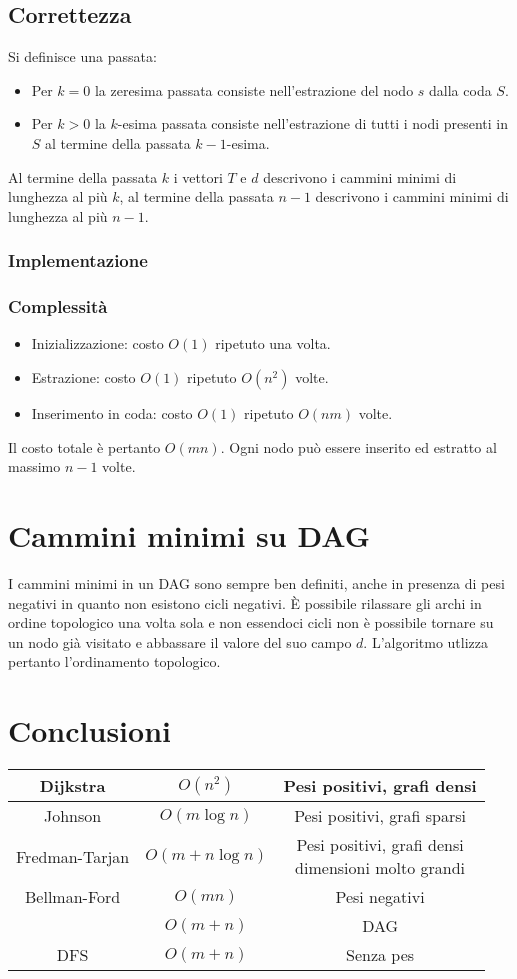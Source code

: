 \subsection{Correttezza}
Si definisce una passata:
\begin{itemize}
	\item Per $k=0$ la zeresima passata consiste nell'estrazione del nodo $s$ dalla coda $S$.
	\item Per $k>0$ la $k$-esima passata consiste nell'estrazione di tutti i nodi presenti in $S$ al termine della passata $k-1$-esima.
\end{itemize}
Al termine della passata $k$ i vettori $T$ e $d$ descrivono i cammini minimi di lunghezza al pi\`u $k$, al termine della passata $n-1$ descrivono i cammini minimi di lunghezza al pi\`u
$n-1$. 
\subsubsection{Implementazione}

\subsubsection{Complessit\`a}
\begin{itemize}
	\item Inizializzazione: costo $O(1)$ ripetuto una volta.
	\item Estrazione: costo $O(1)$ ripetuto $O(n^2)$ volte.
	\item Inserimento in coda: costo $O(1)$ ripetuto $O(nm)$ volte.
\end{itemize}
Il costo totale \`e pertanto $O(mn)$. Ogni nodo pu\`o essere inserito ed estratto al massimo $n-1$ volte.
\section{Cammini minimi su DAG}
I cammini minimi in un DAG sono sempre ben definiti, anche in presenza di pesi negativi in quanto non esistono cicli negativi. \`E possibile rilassare gli archi in ordine topologico una
volta sola e non essendoci cicli non \`e possibile tornare su un nodo gi\`a visitato e abbassare il valore del suo campo $d$. L'algoritmo utlizza pertanto l'ordinamento topologico.\\

\section{Conclusioni}
\begin{tabular}{|c|c|c|}
	\hline
	Dijkstra & $O(n^2)$ & Pesi positivi, grafi densi\\
	\hline
	Johnson & $O(m\log n)$ & Pesi positivi, grafi sparsi\\
	\hline
	Fredman-Tarjan & $O(m+n\log n)$ & \makecell{Pesi positivi, grafi densi \\ dimensioni molto grandi}\\
	\hline
	Bellman-Ford & $O(mn)$ & Pesi negativi\\
	\hline
		     & $O(m+n)$ & DAG\\
	\hline
	DFS & $O(m+n)$ & Senza pes\\
	\hline
\end{tabular}
